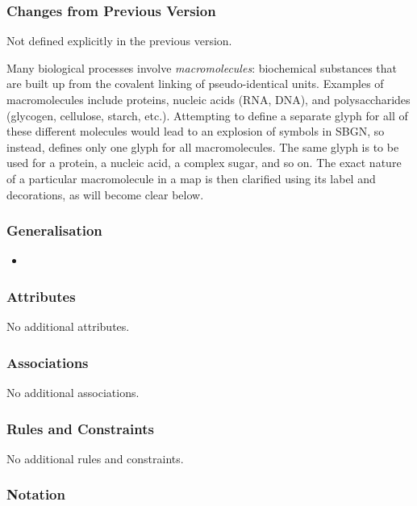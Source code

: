 \subsubsection{Changes from Previous Version}

Not defined explicitly in the previous version.

\label{sec:techref:macromolecule}

Many biological processes involve \emph{macromolecules}: biochemical
substances that are built up from the covalent linking of
pseudo-identical units.  Examples of macromolecules include proteins,
nucleic acids (RNA, DNA), and polysaccharides (glycogen, cellulose,
starch, etc.).  Attempting to define a separate glyph for all of these
different molecules would lead to an explosion of symbols in SBGN, so
instead, \SBGNPDLone defines only one glyph for all macromolecules.
The same glyph is to be used for a protein, a nucleic acid, a complex
sugar, and so on.  The exact nature of a particular macromolecule in a
map is then clarified using its label and decorations, as will become
clear below.

\subsubsection{Generalisation}

\begin{itemize}
\item {}
\end{itemize}

\subsubsection{Attributes}

No additional attributes.

\subsubsection{Associations}

No additional associations.

\subsubsection{Rules and Constraints}

No additional rules and constraints.

\subsubsection{Notation}

